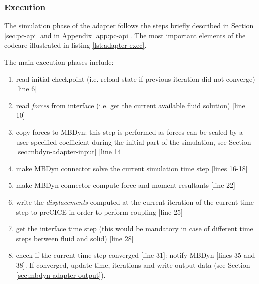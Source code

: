 \subsubsection{Execution}

The simulation phase of the adapter follows the steps briefly described in Section \ref{sec:pc-api} and in Appendix \ref{app:pc-api}. The most important elements of the codeare  illustrated in listing \ref{lst:adapter-exec}.

The main execution phases include:

\begin{enumerate}
    \item read initial checkpoint (i.e. reload state if previous iteration did not converge) [line 6]
    \item read \textit{forces} from interface (i.e. get the current available fluid solution) [line 10]
    \item copy forces to MBDyn: this step is performed as forces can be scaled by a user specified coefficient during the initial part of the simulation, see Section \ref{sec:mbdyn-adapter-input} [line 14]
    \item make MBDyn connector solve the current simulation time step [lines 16-18]
    \item make MBDyn connector compute force and moment resultants [line 22]
    \item write the \textit{displacements} computed at the current iteration of the current time step to preCICE in order to perform coupling [line 25]
    \item get the interface time step (this would be mandatory in case of different time steps between fluid and solid) [line 28]
    \item check if the current time step converged [line 31]:
    notify MBDyn [lines 35 and 38]. If converged, update time, iterations and write output data (see Section \ref{sec:mbdyn-adapter-output}).
\end{enumerate}

